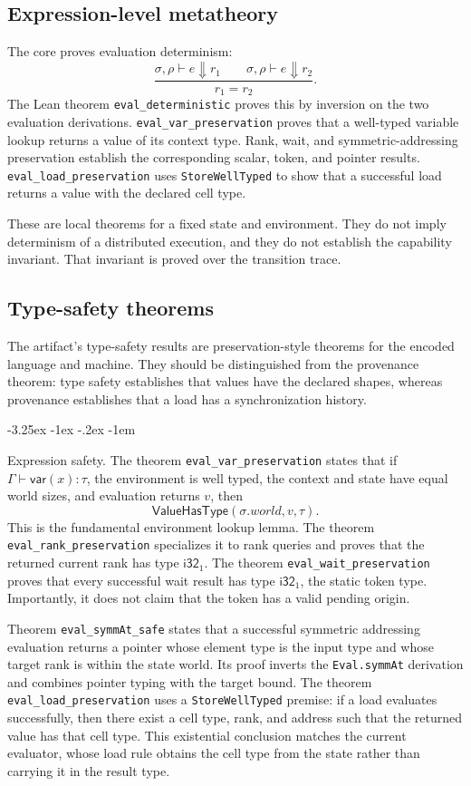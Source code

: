 \documentclass[a4paper,USenglish]{lipics-v2021}
\makeatletter
\renewcommand\paragraph{\@startsection{paragraph}{4}{\z@}%
  {-3.25ex \@plus -1ex \@minus -.2ex}%
  {-1em}%
  {\sffamily\large\bfseries\raggedright}}
\makeatother
\begin{document}
\subsection{Expression-level metatheory}
The core proves evaluation determinism:
\[
 \frac{\sigma,\rho\vdash e\Downarrow r_1 \qquad
   \sigma,\rho\vdash e\Downarrow r_2}{r_1=r_2}.
\]
The Lean theorem \texttt{eval\_deterministic} proves this by inversion on
the two evaluation derivations. \texttt{eval\_var\_preservation} proves
that a well-typed variable lookup returns a value of its context type.
Rank, wait, and symmetric-addressing preservation establish the corresponding
scalar, token, and pointer results. \texttt{eval\_load\_preservation} uses
\texttt{StoreWellTyped} to show that a successful load returns a value with
the declared cell type.

These are local theorems for a fixed state and environment. They do not imply
determinism of a distributed execution, and they do not establish the
capability invariant. That invariant is proved over the transition trace.

\subsection{Type-safety theorems}
The artifact's type-safety results are preservation-style theorems for the
encoded language and machine. They should be distinguished from the provenance
theorem: type safety establishes that values have the declared shapes, whereas
provenance establishes that a load has a synchronization history.

\paragraph{Expression safety.}
The theorem \texttt{eval\_var\_preservation} states that if
\(\Gamma\vdash \mathsf{var}(x):\tau\), the environment is well typed, the
context and state have equal world sizes, and evaluation returns \(v\), then
\[
 \mathsf{ValueHasType}(\sigma.world,v,\tau).
\]
This is the fundamental environment lookup lemma. The theorem
\texttt{eval\_rank\_preservation} specializes it to rank queries and proves
that the returned current rank has type \(\mathsf{i32}_1\). The theorem
\texttt{eval\_wait\_preservation} proves that every successful wait result
has type \(\mathsf{i32}_1\), the static token type. Importantly, it does not
claim that the token has a valid pending origin.

Theorem \texttt{eval\_symmAt\_safe} states that a successful symmetric
addressing evaluation returns a pointer whose element type is the input type
and whose target rank is within the state world. Its proof inverts the
\texttt{Eval.symmAt} derivation and combines pointer typing with the target
bound. The theorem \texttt{eval\_load\_preservation} uses a
\texttt{StoreWellTyped} premise: if a load evaluates successfully, then there
exist a cell type, rank, and address such that the returned value has that
cell type. This existential conclusion matches the current evaluator, whose
load rule obtains the cell type from the state rather than carrying it in the
result type.
\end{document}
